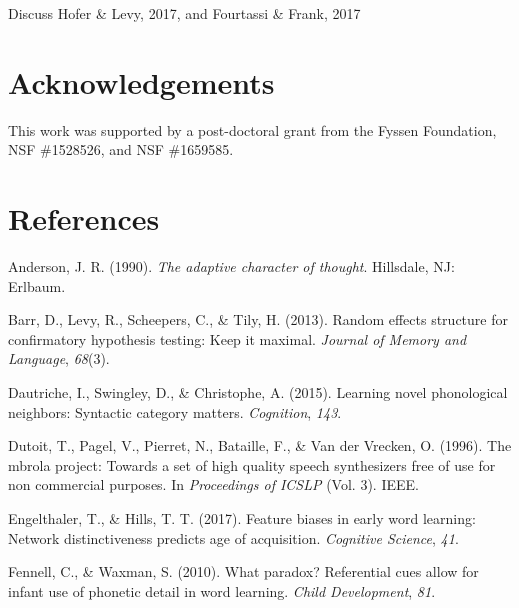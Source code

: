 \documentclass[10pt, letterpaper]{article}
\begin{document}
Discuss Hofer \& Levy, 2017, and Fourtassi \& Frank, 2017

\vspace{1em}

\vspace{1em}

\section{Acknowledgements}\label{acknowledgements}

This work was supported by a post-doctoral grant from the Fyssen
Foundation, NSF \#1528526, and NSF \#1659585.

\section{References}\label{references}

\setlength{\parindent}{-0.1in} \setlength{\leftskip}{0.125in} \noindent

\hypertarget{refs}{}
\hypertarget{ref-anderson1990}{}
Anderson, J. R. (1990). \emph{The adaptive character of thought}.
Hillsdale, NJ: Erlbaum.

\hypertarget{ref-barr2013}{}
Barr, D., Levy, R., Scheepers, C., \& Tily, H. (2013). Random effects
structure for confirmatory hypothesis testing: Keep it maximal.
\emph{Journal of Memory and Language}, \emph{68}(3).

\hypertarget{ref-dautriche2015}{}
Dautriche, I., Swingley, D., \& Christophe, A. (2015). Learning novel
phonological neighbors: Syntactic category matters. \emph{Cognition},
\emph{143}.

\hypertarget{ref-dutoit1996}{}
Dutoit, T., Pagel, V., Pierret, N., Bataille, F., \& Van der Vrecken, O.
(1996). The mbrola project: Towards a set of high quality speech
synthesizers free of use for non commercial purposes. In
\emph{Proceedings of ICSLP} (Vol. 3). IEEE.

\hypertarget{ref-engelthaler2017}{}
Engelthaler, T., \& Hills, T. T. (2017). Feature biases in early word
learning: Network distinctiveness predicts age of acquisition.
\emph{Cognitive Science}, \emph{41}.

\hypertarget{ref-fennell2010}{}
Fennell, C., \& Waxman, S. (2010). What paradox? Referential cues allow
for infant use of phonetic detail in word learning. \emph{Child
Development}, \emph{81}.
\end{document}
